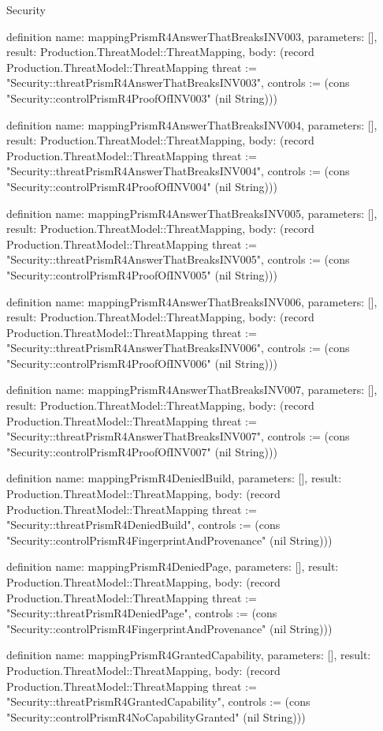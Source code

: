 \begin{lexlean}{Security}
\begin{semanticmodule}
definition{
  name: mappingPrismR4AnswerThatBreaksINV003,
  parameters: [],
  result: Production.ThreatModel::ThreatMapping,
  body: (record Production.ThreatModel::ThreatMapping {threat := "Security::threatPrismR4AnswerThatBreaksINV003", controls := (cons "Security::controlPrismR4ProofOfINV003" (nil String))})
}

definition{
  name: mappingPrismR4AnswerThatBreaksINV004,
  parameters: [],
  result: Production.ThreatModel::ThreatMapping,
  body: (record Production.ThreatModel::ThreatMapping {threat := "Security::threatPrismR4AnswerThatBreaksINV004", controls := (cons "Security::controlPrismR4ProofOfINV004" (nil String))})
}

definition{
  name: mappingPrismR4AnswerThatBreaksINV005,
  parameters: [],
  result: Production.ThreatModel::ThreatMapping,
  body: (record Production.ThreatModel::ThreatMapping {threat := "Security::threatPrismR4AnswerThatBreaksINV005", controls := (cons "Security::controlPrismR4ProofOfINV005" (nil String))})
}

definition{
  name: mappingPrismR4AnswerThatBreaksINV006,
  parameters: [],
  result: Production.ThreatModel::ThreatMapping,
  body: (record Production.ThreatModel::ThreatMapping {threat := "Security::threatPrismR4AnswerThatBreaksINV006", controls := (cons "Security::controlPrismR4ProofOfINV006" (nil String))})
}

definition{
  name: mappingPrismR4AnswerThatBreaksINV007,
  parameters: [],
  result: Production.ThreatModel::ThreatMapping,
  body: (record Production.ThreatModel::ThreatMapping {threat := "Security::threatPrismR4AnswerThatBreaksINV007", controls := (cons "Security::controlPrismR4ProofOfINV007" (nil String))})
}

definition{
  name: mappingPrismR4DeniedBuild,
  parameters: [],
  result: Production.ThreatModel::ThreatMapping,
  body: (record Production.ThreatModel::ThreatMapping {threat := "Security::threatPrismR4DeniedBuild", controls := (cons "Security::controlPrismR4FingerprintAndProvenance" (nil String))})
}

definition{
  name: mappingPrismR4DeniedPage,
  parameters: [],
  result: Production.ThreatModel::ThreatMapping,
  body: (record Production.ThreatModel::ThreatMapping {threat := "Security::threatPrismR4DeniedPage", controls := (cons "Security::controlPrismR4FingerprintAndProvenance" (nil String))})
}

definition{
  name: mappingPrismR4GrantedCapability,
  parameters: [],
  result: Production.ThreatModel::ThreatMapping,
  body: (record Production.ThreatModel::ThreatMapping {threat := "Security::threatPrismR4GrantedCapability", controls := (cons "Security::controlPrismR4NoCapabilityGranted" (nil String))})
}


\end{semanticmodule}
\end{lexlean}
